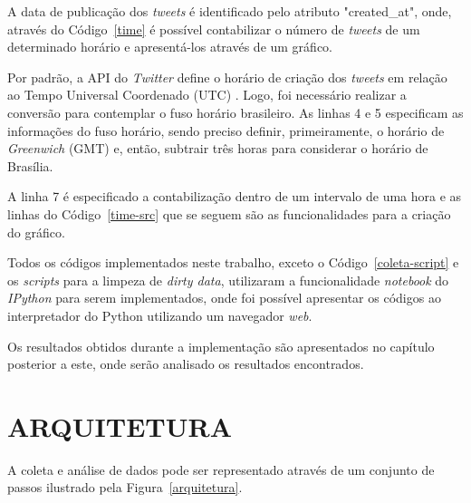 

A data de publicação dos \textit{tweets} é identificado pelo atributo "created\_at", onde, através do Código~\ref{time} é possível contabilizar o número de \textit{tweets} de um determinado horário e apresentá-los através de um gráfico.

Por padrão, a API do \textit{Twitter} define o horário de criação dos \textit{tweets} em relação ao Tempo Universal Coordenado (UTC) \cite{twitter-doc}. Logo, foi necessário realizar a conversão para contemplar o fuso horário brasileiro. As linhas 4 e 5 especificam as informações do fuso horário, sendo preciso definir, primeiramente, o horário de \textit{Greenwich} (GMT) e, então, subtrair três horas para considerar o horário de Brasília.

A linha 7 é especificado a contabilização dentro de um intervalo de uma hora e as linhas do Código~\ref{time-src} que se seguem são as funcionalidades para a criação do gráfico.



Todos os códigos implementados neste trabalho, exceto o Código~\ref{coleta-script} e os \textit{scripts} para a limpeza de \textit{dirty data}, utilizaram a funcionalidade \textit{notebook} do \textit{IPython} para serem implementados, onde foi possível apresentar os códigos ao interpretador do Python utilizando um navegador \textit{web}.

Os resultados obtidos durante a implementação são apresentados no capítulo posterior a este, onde serão analisado os resultados encontrados.

\section{ARQUITETURA}
A coleta e análise de dados pode ser representado através de um conjunto de passos ilustrado pela Figura~\ref{arquitetura}.

